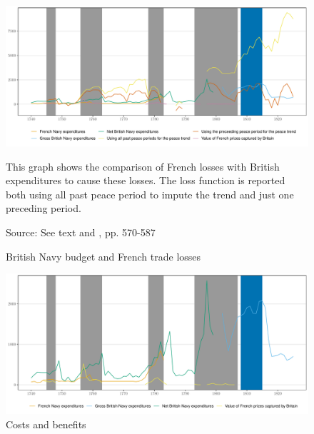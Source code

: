 \documentclass[12pt,a4paper,notitlepage,english]{article}
\newcommand{\fontsmall}{\fontsize{10pt}{12pt}\selectfont}
\newcommand{\source}[1]{\caption*{\footnotesize Source: {#1}} }
\begin{document}
\begin{appendix}
\begin{figure}[h!]
\caption{British Navy budget and French trade losses}
\label{Expenditures}
\centering
\includegraphics[scale=0.2]{Expenditures_Annual_Loss}
\begin{minipage}{18cm}
\begin{flushleft}
\fontsmall
This graph shows the comparison of French losses with British expenditures to cause these losses. The loss function is reported both using all past peace period to impute the trend and just one preceding period. 
\end{flushleft}
\end{minipage}
\source{See text and \cite{mitchell1988}, pp. 570-587}
\end{figure}

\begin{figure}[h!]
\caption{Costs and benefits}
\label{Costs_and_benefits}
\centering
\includegraphics[scale=0.18]{Costs_and_benefits}
\begin{minipage}{18cm}
\begin{flushleft}
\fontsmall 
{}
\end{flushleft}
\end{minipage}
\end{figure}


\end{appendix}
\end{document}
